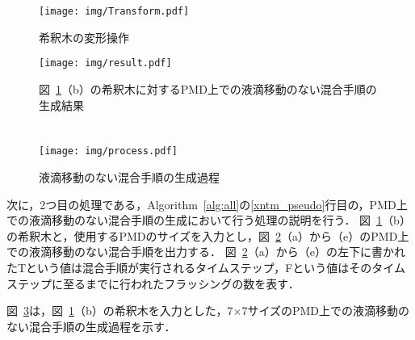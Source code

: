 \begin{figure}[tbp]
 \centering\texttt{[image: img/Transform.pdf]}
 \caption{希釈木の変形操作}\label{fig:Transform}
\end{figure}

\begin{figure}[tbp]
 \centering\texttt{[image: img/result.pdf]}
    \caption{図~\ref{fig:Transform}（b）の希釈木に対するPMD上での液滴移動のない混合手順の生成結果}\label{fig:result}
\end{figure}


\section{}
\begin{figure}[tbp]
 \centering\texttt{[image: img/process.pdf]}
 \caption{液滴移動のない混合手順の生成過程}\label{fig:process}
\end{figure}
次に，2つ目の処理である，Algorithm~\ref{alg:all}の\ref{xntm_pseudo}行目の，PMD上での液滴移動のない混合手順の生成において行う処理の説明を行う．
図~\ref{fig:Transform}（b）の希釈木と，使用するPMDのサイズを入力とし，図~\ref{fig:result}（a）から（e）のPMD上での液滴移動のない混合手順を出力する．
図~\ref{fig:result}（a）から（e）の左下に書かれたTという値は混合手順が実行されるタイムステップ，Fという値はそのタイムステップに至るまでに行われたフラッシングの数を表す．

図~\ref{fig:process}は，図~\ref{fig:Transform}（b）の希釈木を入力とした，7$\times$7サイズのPMD上での液滴移動のない混合手順の生成過程を示す．





